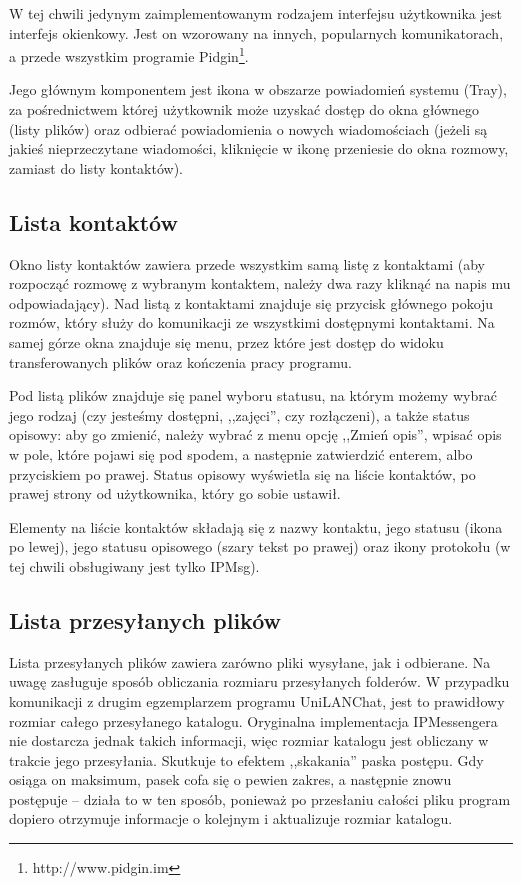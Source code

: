 \documentclass[11pt,leqno]{article}
\begin{document}
W tej chwili jedynym zaimplementowanym rodzajem interfejsu użytkownika jest interfejs okienkowy.
Jest on wzorowany na innych, popularnych komunikatorach, a przede wszystkim programie
Pidgin\footnote{http://www.pidgin.im}.

Jego głównym komponentem jest ikona w obszarze powiadomień systemu (Tray), za pośrednictwem której
użytkownik może uzyskać dostęp do okna głównego (listy plików) oraz odbierać powiadomienia o nowych
wiadomościach (jeżeli są jakieś nieprzeczytane wiadomości, kliknięcie w ikonę przeniesie do okna
rozmowy, zamiast do listy kontaktów).

\subsection{Lista kontaktów}

Okno listy kontaktów zawiera przede wszystkim samą listę z kontaktami (aby rozpocząć rozmowę
z wybranym kontaktem, należy dwa razy kliknąć na napis mu odpowiadający). Nad listą z kontaktami
znajduje się przycisk głównego pokoju rozmów, który służy do komunikacji ze wszystkimi dostępnymi
kontaktami. Na samej górze okna znajduje się menu, przez które jest dostęp do widoku transferowanych
plików oraz kończenia pracy programu.

Pod listą plików znajduje się panel wyboru statusu, na którym możemy wybrać jego rodzaj (czy jesteśmy
dostępni, ,,zajęci'', czy rozłączeni), a także status opisowy: aby go zmienić, należy wybrać
z menu opcję ,,Zmień opis'', wpisać opis w pole, które pojawi się pod spodem, a następnie
zatwierdzić enterem, albo przyciskiem po prawej. Status opisowy wyświetla się na liście kontaktów,
po prawej strony od użytkownika, który go sobie ustawił.

Elementy na liście kontaktów składają się z nazwy kontaktu, jego statusu (ikona po lewej), jego
statusu opisowego (szary tekst po prawej) oraz ikony protokołu (w tej chwili obsługiwany jest tylko
IPMsg).

\subsection{Lista przesyłanych plików}

Lista przesyłanych plików zawiera zarówno pliki wysyłane, jak i odbierane. Na uwagę zasługuje sposób
obliczania rozmiaru przesyłanych folderów. W przypadku komunikacji z drugim egzemplarzem programu
UniLANChat, jest to prawidłowy rozmiar całego przesyłanego katalogu. Oryginalna implementacja
IPMessengera nie dostarcza jednak takich informacji, więc rozmiar katalogu jest obliczany w trakcie
jego przesyłania. Skutkuje to efektem ,,skakania'' paska postępu. Gdy osiąga on maksimum, pasek
cofa się o pewien zakres, a następnie znowu postępuje -- działa to w ten sposób, ponieważ po
przesłaniu całości pliku program dopiero otrzymuje informacje o kolejnym i aktualizuje rozmiar
katalogu.
\end{document}
